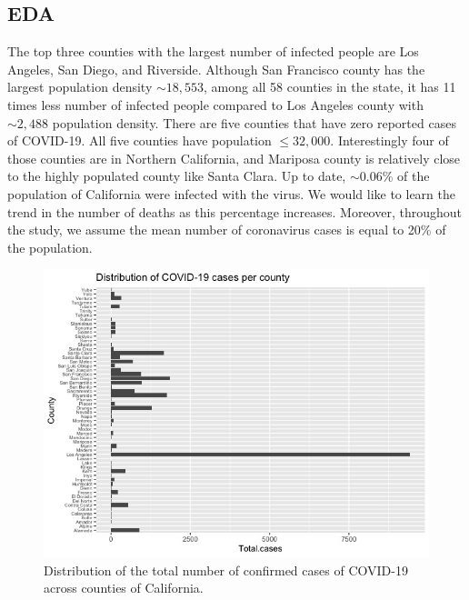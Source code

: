 \documentclass[11pt,twocolumn]{asaproc}
\begin{document}
\subsection{EDA}
The top three counties with the largest number of infected people are Los Angeles, San Diego, and Riverside.  Although San Francisco county has the largest population density $\sim18,553$, among all 58 counties in the state, it has 11 times less number of infected people compared to Los Angeles county with $\sim2,488$ population density. There are five counties that have zero reported cases of COVID-19. All five counties have population $\leq 32,000$. Interestingly four of those counties are in Northern California, and Mariposa county is relatively close to the highly populated county like Santa Clara. Up to date, $\sim 0.06\%$ of the population of California were infected with the virus. We would like to learn the trend in the number of deaths as this percentage increases. Moreover, throughout the study, we assume the mean number of coronavirus cases is equal to 20\% of the population. 

\begin{figure}[t]
\centering\includegraphics[scale=.30]{infected_per_county.jpeg}
\caption{Distribution of the total number of confirmed cases of COVID-19 across counties of California.}
\label{fig:totcases}
\end{figure}
\end{document}
